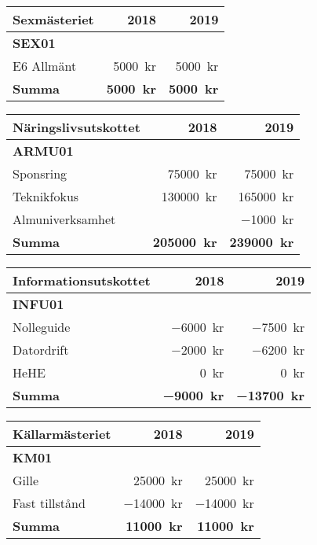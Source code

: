 \documentclass[../_main/handlingar.tex]{subfiles}
\begin{document}
\begin{tabularx}{10cm}{X r r}
    \textbf{\large Sexmästeriet} & \textbf{2018} & \textbf{2019} \\
    \hline
    \textbf{SEX01} \\
    E6 Allmänt & \SI{5000}{kr} & \SI{5000}{kr} \\
    \hline
    \textbf{Summa} & \textbf{\SI{5000}{kr}} & \textbf{\SI{5000}{kr}} \\
\end{tabularx}

\begin{tabularx}{10cm}{X r r}
    \textbf{\large Näringslivsutskottet} & \textbf{2018} & \textbf{2019} \\
    \hline
    \textbf{ARMU01} \\
    Sponsring & \SI{75000}{kr} & \SI{75000}{kr} \\
    Teknikfokus & \SI{130000}{kr} & \SI{165000}{kr} \\
    Almuniverksamhet &  & \SI{-1000}{kr} \\
    \hline
    \textbf{Summa} & \textbf{\SI{205000}{kr}} & \textbf{\SI{239000}{kr}} \\
\end{tabularx}

\begin{tabularx}{10cm}{X r r}
    \textbf{\large Informationsutskottet} & \textbf{2018} & \textbf{2019} \\
    \hline
    \textbf{INFU01} \\
    Nolleguide & \SI{-6000}{kr} & \SI{-7500}{kr} \\
    Datordrift & \SI{-2000}{kr} & \SI{-6200}{kr} \\
    HeHE & \SI{0}{kr} & \SI{0}{kr} \\
    \hline
    \textbf{Summa} & \textbf{\SI{-9000}{kr}} & \textbf{\SI{-13700}{kr}} \\
\end{tabularx}

\begin{tabularx}{10cm}{X r r}
    \textbf{\large Källarmästeriet} & \textbf{2018} & \textbf{2019} \\
    \hline
    \textbf{KM01} \\
    Gille & \SI{25000}{kr} & \SI{25000}{kr} \\
    Fast tillstånd & \SI{-14000}{kr} & \SI{-14000}{kr} \\
    \hline
    \textbf{Summa} & \textbf{\SI{11000}{kr}} & \textbf{\SI{11000}{kr}} \\
\end{tabularx}
\end{document}
